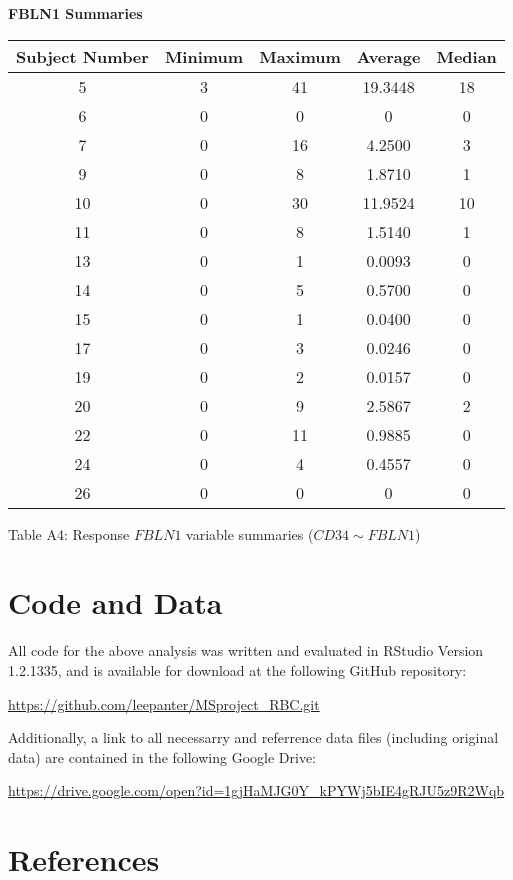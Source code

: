 \documentclass[12pt,]{article}
\begin{document}
\begin{center}

\textbf{\large{FBLN1 Summaries}}


\begin{tabular}{|c|c|c|c|c|}
\hline 
Subject Number & Minimum & Maximum & Average & Median \\ 
\hline
\hline
5  & 3 & 41 & 19.3448 & 18 \\ 
\hline 
6  & 0 & 0 & 0 & 0 \\ 
\hline 
7  & 0 & 16 & 4.2500 & 3 \\ 
\hline 
9  & 0 & 8 & 1.8710 & 1 \\ 
\hline 
10 & 0 & 30 & 11.9524 & 10 \\ 
\hline 
11 & 0 & 8 & 1.5140 & 1 \\ 
\hline 
13 & 0 & 1 & 0.0093 & 0 \\ 
\hline 
14 & 0 & 5 & 0.5700 & 0 \\ 
\hline 
15 & 0 & 1 & 0.0400 & 0 \\ 
\hline 
17 & 0 & 3 & 0.0246 & 0 \\ 
\hline 
19 & 0 & 2 & 0.0157 & 0 \\ 
\hline 
20 & 0 & 9 & 2.5867 & 2 \\ 
\hline 
22 & 0 & 11 & 0.9885 & 0 \\ 
\hline 
24 & 0 & 4 & 0.4557 & 0 \\ 
\hline 
26 & 0 & 0 & 0 & 0 \\ 
\hline
\end{tabular}

\vspace{5pt}

Table A4: Response $FBLN1$ variable summaries ($CD34 \sim FBLN1$)
\end{center}

\newpage

\hypertarget{code-and-data}{%
\section{Code and Data}\label{code-and-data}}

All code for the above analysis was written and evaluated in RStudio
Version 1.2.1335, and is available for download at the following GitHub
repository:

\url{https://github.com/leepanter/MSproject_RBC.git}

Additionally, a link to all necessarry and referrence data files
(including original data) are contained in the following Google Drive:

\url{https://drive.google.com/open?id=1gjHaMJG0Y_kPYWj5bIE4gRJU5z9R2Wqb}

\hypertarget{references}{%
\section{References}\label{references}}


\end{document}
